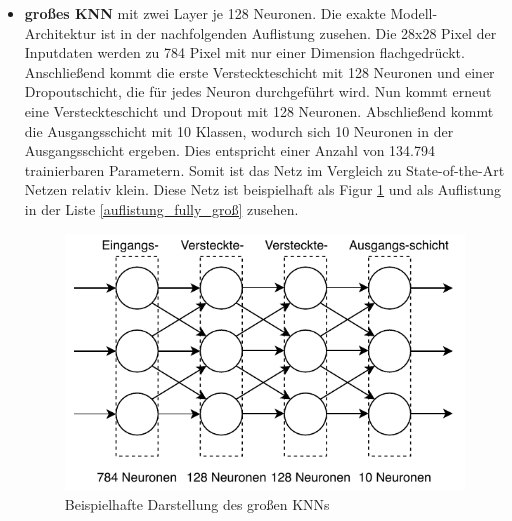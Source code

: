 \begin{itemize}
Beispielhaft wird die Trainingsdauer des kleinen Netzes für 10 und 80 Epochen evaluiert. Bei 10 Epochen dauerte der Trainingsvorgang 34 Sekunden und für 80 Epochen 252 Sekunden. Diese Werte wurden auf einem Intel i7-7700 3,6 GHz erreicht.
\newpage
{\small
\begin{lstlisting}[language=C,caption=Exakte Modell-Architektur des kleinen Fully-Conneted-Networks,label=auflistung_fully_klein]
_______________________________________________________________
Layer (type)                 Output Shape              Param #
===============================================================
flatten (Flatten)            (None, 784)               0
_______________________________________________________________
dense (Dense)                (None, 128)               100480
_______________________________________________________________
dropout (Dropout)            (None, 128)               0
_______________________________________________________________
dense_1 (Dense)              (None, 10)                1290
===============================================================
Total params: 101,770
_______________________________________________________________
\end{lstlisting}
}

\item \textbf{großes KNN} mit zwei Layer je 128 Neuronen. Die exakte Modell-Architektur ist in der nachfolgenden Auflistung zusehen. Die 28x28 Pixel der Inputdaten werden zu 784 Pixel mit nur einer Dimension flachgedrückt. Anschließend kommt die erste Versteckteschicht mit 128 Neuronen und einer Dropoutschicht, die für jedes Neuron durchgeführt wird. Nun kommt erneut eine Versteckteschicht und Dropout mit 128 Neuronen. Abschließend kommt die Ausgangsschicht mit 10 Klassen, wodurch sich 10 Neuronen in der Ausgangsschicht ergeben. Dies entspricht einer Anzahl von 134.794 trainierbaren Parametern. Somit ist das Netz im Vergleich zu State-of-the-Art Netzen relativ klein. Diese Netz ist beispielhaft als Figur \ref{fig:mlp_2x128} und als Auflistung in der Liste \ref{auflistung_fully_groß} zusehen.

\noindent%
\begin{figure}[H]
  \centering  
  \includegraphics[scale=0.9]{img/mlp_2x128.pdf}
  \caption{Beispielhafte Darstellung des großen KNNs}
  \label{fig:mlp_2x128}
\end{figure}


\end{itemize}

